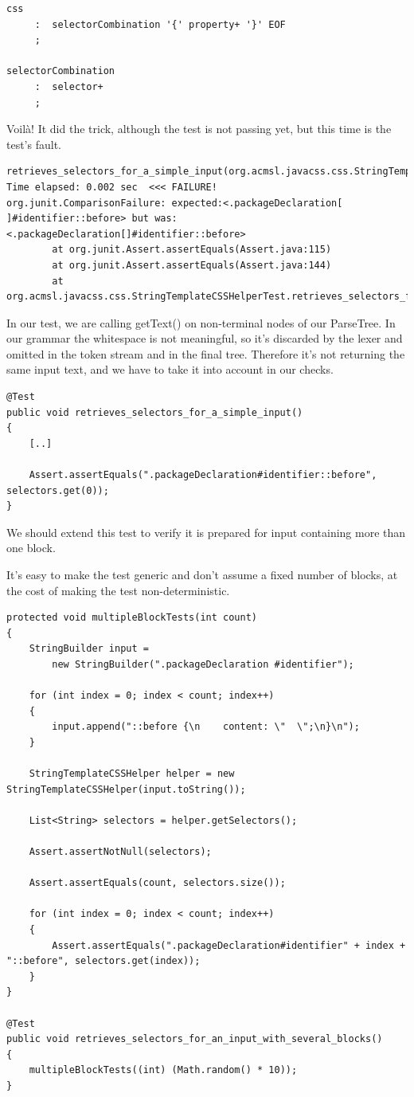 \documentclass[11pt]{article}
\begin{document}
\begin{verbatim}
css
     :	selectorCombination '{' property+ '}' EOF
     ;

selectorCombination
     :	selector+
     ;
\end{verbatim}

Voilà! It did the trick, although the test is not passing yet, but this time is the test's fault.

\begin{verbatim}
retrieves_selectors_for_a_simple_input(org.acmsl.javacss.css.StringTemplateCSSHelperTest)  Time elapsed: 0.002 sec  <<< FAILURE!
org.junit.ComparisonFailure: expected:<.packageDeclaration[ ]#identifier::before> but was:<.packageDeclaration[]#identifier::before>
        at org.junit.Assert.assertEquals(Assert.java:115)
        at org.junit.Assert.assertEquals(Assert.java:144)
        at org.acmsl.javacss.css.StringTemplateCSSHelperTest.retrieves_selectors_for_a_simple_input(StringTemplateCSSHelperTest.java:70)
\end{verbatim}

In our test, we are calling getText() on non-terminal nodes of our ParseTree. In our grammar the whitespace is not meaningful, so it's
discarded by the lexer and omitted in the token stream and in the final tree. Therefore it's not returning the same input text, and
we have to take it into account in our checks.

\begin{verbatim}
@Test
public void retrieves_selectors_for_a_simple_input()
{
    [..]

    Assert.assertEquals(".packageDeclaration#identifier::before", selectors.get(0));
}
\end{verbatim}

We should extend this test to verify it is prepared for input containing more than one block.

It's easy to make the test generic and don't assume a fixed number of blocks, at the cost of making
the test non-deterministic.

\begin{verbatim}
protected void multipleBlockTests(int count)
{
    StringBuilder input =
        new StringBuilder(".packageDeclaration #identifier");

    for (int index = 0; index < count; index++)
    {
        input.append("::before {\n    content: \"  \";\n}\n");
    }

    StringTemplateCSSHelper helper = new StringTemplateCSSHelper(input.toString());

    List<String> selectors = helper.getSelectors();

    Assert.assertNotNull(selectors);

    Assert.assertEquals(count, selectors.size());

    for (int index = 0; index < count; index++)
    {
        Assert.assertEquals(".packageDeclaration#identifier" + index + "::before", selectors.get(index));
    }
}

@Test
public void retrieves_selectors_for_an_input_with_several_blocks()
{
    multipleBlockTests((int) (Math.random() * 10));
}
\end{verbatim}
\end{document}
